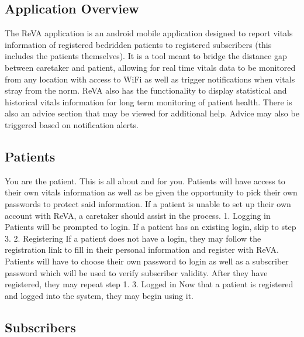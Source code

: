 \subsection{Application Overview}
The ReVA application is an android mobile application designed to report vitals information of registered bedridden patients to registered subscribers (this includes the patients themselves). It is a tool meant to bridge the distance gap between caretaker and patient, allowing for real time vitals data to be monitored from any location with access to WiFi as well as trigger notifications when vitals stray from the norm. ReVA also has the functionality to display statistical and historical vitals information for long term monitoring of patient health. There is also an advice section that may be viewed for additional help. Advice may also be triggered based on notification alerts. 
\subsection{Patients}
	You are the patient. This is all about and for you. Patients will have access to their own vitals information as well as be given the opportunity to pick their own passwords to protect said information. If a patient is unable to set up their own account with ReVA, a caretaker should assist in the process. 
	1. Logging in
		Patients will be prompted to login. If a patient has an existing login, skip to step 3. 
	2. Registering
		If a patient does not have a login, they may follow the registration link to fill in their personal information and 			register with ReVA. Patients will have to choose their own password to login as well as a subscriber password which will 		 be used to verify subscriber validity. After they have registered, they may repeat step 1. 
	3. Logged in
		Now that a patient is registered and logged into the system, they may begin using it. 
\subsection{Subscribers} %
